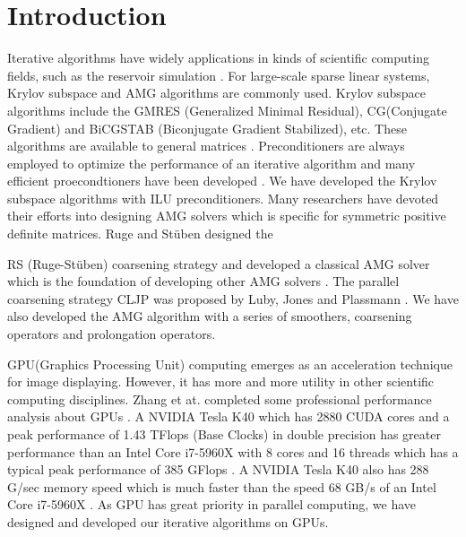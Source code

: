 \documentclass[runningheads,a4paper]{llncs}
\begin{document}
\section{Introduction}
Iterative algorithms have widely applications in kinds of scientific computing fields, such as the reservoir simulation \cite{john}. For large-scale sparse linear systems, Krylov subspace and AMG algorithms are commonly used. Krylov subspace algorithms include the GMRES (Generalized Minimal Residual), CG(Conjugate Gradient) and BiCGSTAB (Biconjugate Gradient Stabilized), etc. These algorithms are available to general matrices \cite{saad,template}. Preconditioners are always employed to optimize the performance of an iterative algorithm and many efficient proecondtioners have been developed \cite{jcxu,CHM,g_mstage,hui}. We have developed the Krylov subspace algorithms with ILU preconditioners. Many researchers have devoted their efforts into designing AMG solvers which is specific for symmetric positive definite matrices. Ruge and St\"{u}ben designed the {RS (Ruge-St\"{u}ben) coarsening strategy and developed a classical AMG solver  which is the foundation of developing other AMG solvers \cite{Stuben1,Stuben2,BMR,CW,PV}. The parallel coarsening strategy CLJP was proposed by Luby, Jones and Plassmann \cite{hypre,rsamg}. We have also developed the AMG algorithm with a series of smoothers, coarsening operators and prolongation operators.

GPU(Graphics Processing Unit) computing emerges as an acceleration technique for image displaying. However, it has more and more utility in other scientific computing disciplines. Zhang et at. completed some professional performance analysis about GPUs \cite{pzhang2}. A NVIDIA Tesla K40 which has 2880 CUDA cores and a peak performance of 1.43 TFlops (Base Clocks) in double precision has greater performance than
an Intel Core i7-5960X with 8 cores and 16 threads which has a typical peak performance of 385 GFlops \cite{k80k40,fujitsu5960x}. A NVIDIA Tesla K40 also has 288 G/sec memory speed which is much faster than the speed 68 GB/s of an Intel Core i7-5960X \cite{k80k40,fujitsu5960x}. As GPU has great priority in parallel computing, we have designed and developed our iterative algorithms on GPUs.

}
\end{document}
